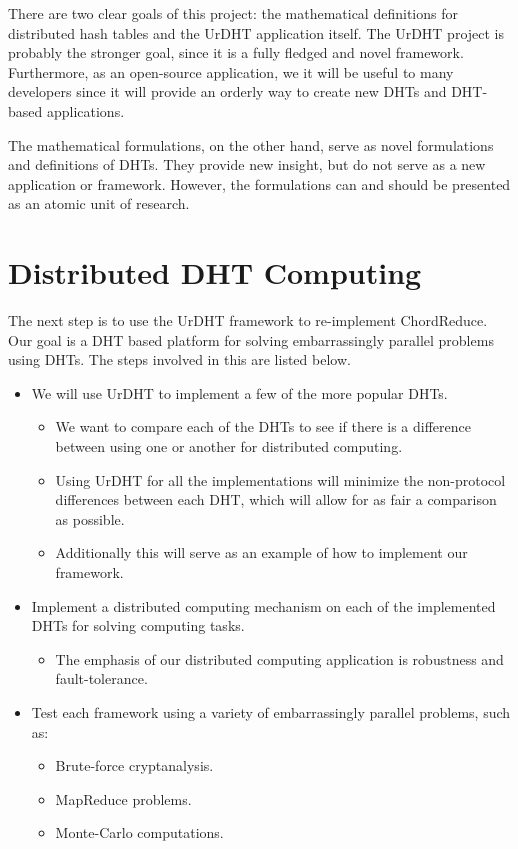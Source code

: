 There are two clear goals of this project: the mathematical definitions for distributed hash tables and the UrDHT application itself.
The UrDHT project is probably the stronger goal, since it is a fully fledged and novel framework.
Furthermore, as an open-source application, we it will be useful to many developers since it will provide an orderly way to create new DHTs and DHT-based applications.

The mathematical formulations, on the other hand, serve as novel formulations and definitions of DHTs.
They provide new insight, but do not serve as a new application or framework.
However, the formulations can and should be presented as an atomic unit of research.


\section{Distributed DHT Computing}

The next step is to use the UrDHT framework to re-implement ChordReduce.
Our goal is a DHT based platform for solving embarrassingly parallel problems using DHTs.
The steps involved in this are listed below.
\begin{itemize}
	\item We will use UrDHT to implement a few of the more popular DHTs.
	\begin{itemize}
		\item We want to compare each of the DHTs to see if there is a difference between using one or another for distributed computing.
		\item Using UrDHT for all the implementations will minimize the non-protocol differences between each DHT, which will allow for as fair a comparison as possible.
		\item Additionally this will serve as an example of how to implement our framework. 
	\end{itemize}
	\item Implement a distributed computing mechanism on each of the implemented DHTs for solving computing tasks.
	\begin{itemize}
		\item The emphasis of our distributed computing application is robustness and fault-tolerance.
	\end{itemize}
	\item Test each framework using a variety of embarrassingly parallel problems, such as:
	\begin{itemize}
		\item Brute-force cryptanalysis.
		\item MapReduce problems.
		\item Monte-Carlo computations.
	\end{itemize}
\end{itemize}

